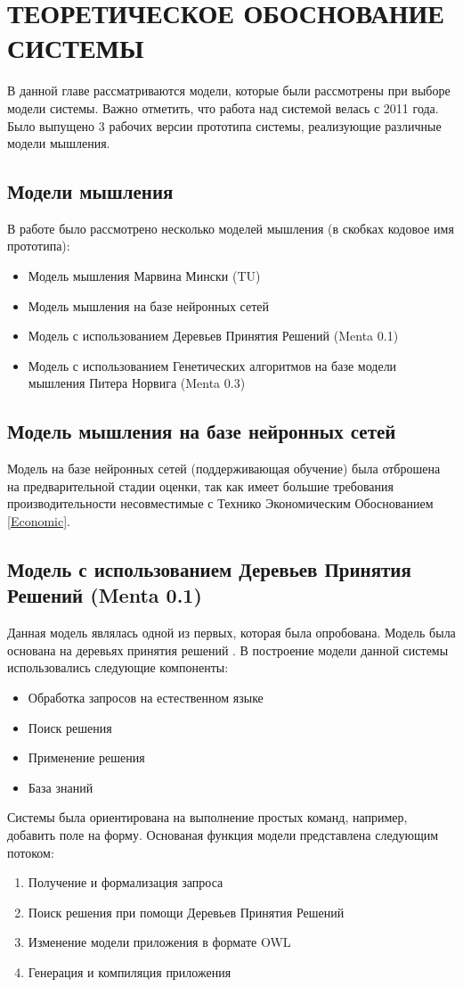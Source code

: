 \chapter{ТЕОРЕТИЧЕСКОЕ ОБОСНОВАНИЕ СИСТЕМЫ}
В данной главе рассматриваются модели, которые были рассмотрены при выборе модели системы. Важно отметить, что работа над системой велась с 2011 года. Было выпущено 3 рабочих версии прототипа системы, реализующие различные модели мышления. 
\section{Модели мышления}
В работе было рассмотрено несколько моделей мышления (в скобках кодовое имя прототипа):
\begin{itemize}
	\item Модель мышления Марвина Мински \cite{EmotionMachine} (TU)
	\item Модель мышления на базе нейронных сетей 
	\item Модель с использованием Деревьев Принятия Решений (Menta 0.1)
	\item Модель с использованием Генетических алгоритмов на базе модели мышления Питера Норвига \cite{ArtificialIntelligence} (Menta 0.3)
\end{itemize}



\section{Модель мышления на базе нейронных сетей}
Модель на базе нейронных сетей (поддерживающая обучение) была отброшена на предварительной стадии оценки, так как имеет большие требования производительности \cite{NEURAL} несовместимые с Технико Экономическим Обоснованием \ref{Economic}.


\section{Модель с использованием Деревьев Принятия Решений (Menta 0.1)}
Данная модель являлась одной из первых, которая была опробована. Модель была основана на деревьях принятия решений \cite{DTREE}. В построение модели данной системы использовались следующие компоненты:
\begin{itemize}
	\item Обработка запросов на естественном языке
	\item Поиск решения
	\item Применение решения
	\item База знаний
\end{itemize}
Системы была ориентирована на выполнение простых команд, например, добавить поле на форму. Основаная функция модели представлена следующим потоком:
\begin{enumerate}
	\item Получение и формализация запроса
	\item Поиск решения при помощи Деревьев Принятия Решений
	\item Изменение модели приложения в формате OWL \cite{OWL}
	\item Генерация и компиляция приложения
\end{enumerate}
